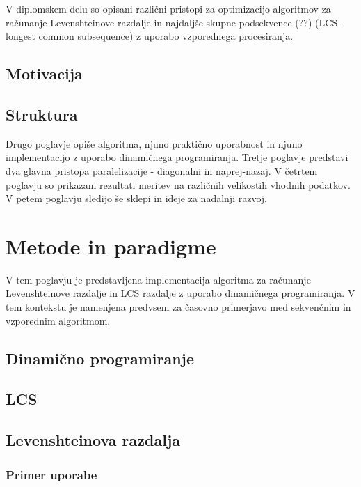 \documentclass[a4paper,12pt,openright]{book}
\begin{document}
V diplomskem delu so opisani različni pristopi za optimizacijo algoritmov za računanje Levenshteinove razdalje in najdaljše skupne podsekvence (??) (LCS - longest common subsequence) z uporabo vzporednega procesiranja. 

\section{Motivacija}



\section{Struktura}

Drugo poglavje opiše algoritma, njuno praktično uporabnost in njuno implementacijo z uporabo dinamičnega programiranja. Tretje poglavje predstavi dva glavna pristopa paralelizacije - diagonalni in naprej-nazaj. V četrtem poglavju so prikazani rezultati meritev na različnih velikostih vhodnih podatkov. V petem poglavju sledijo še sklepi in ideje za nadalnji razvoj. 

\chapter{Metode in paradigme}

V tem poglavju je predstavljena implementacija algoritma za računanje Levenshteinove razdalje in LCS razdalje z uporabo dinamičnega programiranja. V tem kontekstu je namenjena predvsem za časovno primerjavo med sekvenčnim in vzporednim algoritmom. 

\section{Dinamično programiranje}



\section{LCS}

\section{Levenshteinova razdalja}

\subsection{Primer uporabe}
\end{document}
